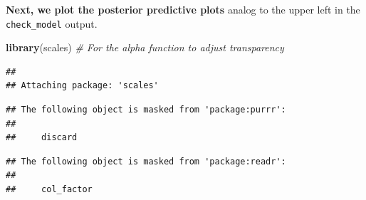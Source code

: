 \documentclass[
]{book}
\newenvironment{Shaded}{\begin{snugshade}}{\end{snugshade}}
\newcommand{\CommentTok}[1]{\textcolor[rgb]{0.56,0.35,0.01}{\textit{#1}}}
\newcommand{\FunctionTok}[1]{\textcolor[rgb]{0.13,0.29,0.53}{\textbf{#1}}}
\newcommand{\NormalTok}[1]{#1}
\begin{document}
\textbf{Next, we plot the posterior predictive plots} analog to the upper left in the \texttt{check\_model} output.

\begin{Shaded}
\begin{Highlighting}[]
\FunctionTok{library}\NormalTok{(scales)  }\CommentTok{\# For the alpha function to adjust transparency}
\end{Highlighting}
\end{Shaded}

\begin{verbatim}
## 
## Attaching package: 'scales'
\end{verbatim}

\begin{verbatim}
## The following object is masked from 'package:purrr':
## 
##     discard
\end{verbatim}

\begin{verbatim}
## The following object is masked from 'package:readr':
## 
##     col_factor
\end{verbatim}
\end{document}
